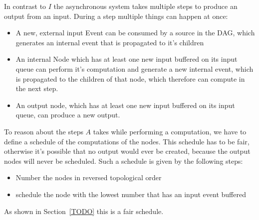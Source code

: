 In contrast to \(I\) the asynchronous system takes multiple steps to produce an output from an input.
During a step multiple things can happen at once:

\begin{itemize}
  \item A new, external input Event can be consumed by a source in the DAG, which generates an internal event that is propagated to it's children
  \item An internal Node which has at least one new input buffered on its input queue can perform
    it's computation and generate a new internal event, which is propagated to the children of that node, which therefore can compute in the next step.
  \item An output node, which has at least one new input buffered on its input queue, can produce a new output.
\end{itemize}

To reason about the steps $A$ takes while performing a computation, we have to define a schedule of the computations of the nodes.
This schedule has to be fair, otherwise it's possible that no output would ever be created, because the output nodes will never be scheduled.
Such a schedule is given by the following steps:

\begin{itemize}
  \item Number the nodes in reversed topological order
  \item schedule the node with the lowest number that has an input event buffered
\end{itemize}

As shown in Section~\ref{TODO} this is a fair schedule.

